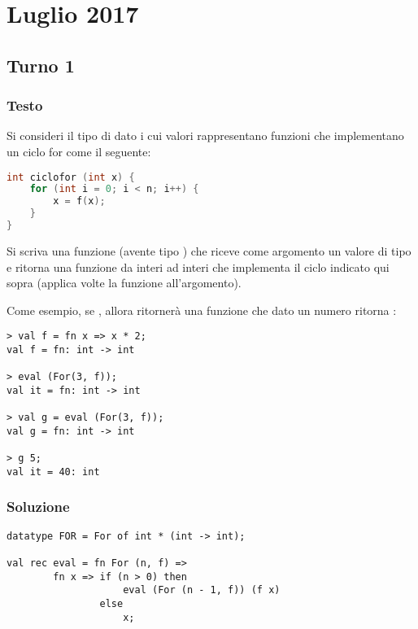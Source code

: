 \section{Luglio 2017}

\subsection{Turno 1}

\subsubsection{Testo}

Si consideri il tipo di dato  i cui valori  rappresentano funzioni che implementano un ciclo for come il seguente:
\begin{lstlisting}[language = C, frame = none]
int ciclofor (int x) {
	for (int i = 0; i < n; i++) {
		x = f(x);
	}
}
\end{lstlisting}

Si scriva una funzione  (avente tipo ) che riceve come argomento un valore di tipo  e ritorna una funzione da interi ad interi che implementa il ciclo indicato qui sopra (applica  volte la funzione  all'argomento).

\medskip
Come esempio, se , allora  ritornerà una funzione che dato un numero  ritorna :
\begin{lstlisting}[style = SML, frame = none]
> val f = fn x => x * 2;
val f = fn: int -> int

> eval (For(3, f));
val it = fn: int -> int

> val g = eval (For(3, f));
val g = fn: int -> int

> g 5;
val it = 40: int
\end{lstlisting}

\subsubsection{Soluzione}

\begin{lstlisting}[style = SML, caption = {Definizione della funzione \sml{eval}}]
datatype FOR = For of int * (int -> int);

val rec eval = fn For (n, f) =>
		fn x => if (n > 0) then
					eval (For (n - 1, f)) (f x)
				else
					x;
\end{lstlisting}

